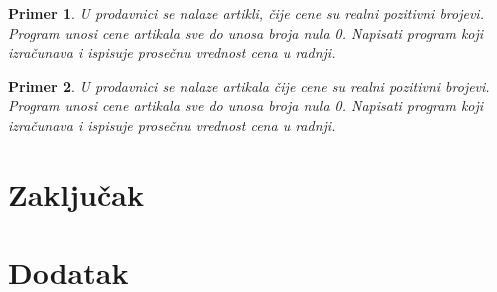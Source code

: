 \documentclass[a4paper]{article}
\newtheorem{primer}{Primer}[section]
\begin{document}
\begin{primer}
U prodavnici se nalaze artikli, čije cene su realni pozitivni
brojevi. Program unosi cene artikala sve do unosa broja nula 0. Napisati program
koji izračunava i ispisuje prosečnu vrednost cena u radnji.
\end{primer}

\begin{primer}
U prodavnici se nalaze artikala čije cene su realni pozitivni
brojevi. Program unosi cene artikala sve do unosa broja nula 0. Napisati program
koji izračunava i ispisuje prosečnu vrednost cena u radnji.
\end{primer}




\section{Zaključak}
\label{sec:zakljucak}

 


\appendix
\section{Dodatak}
\end{document}
